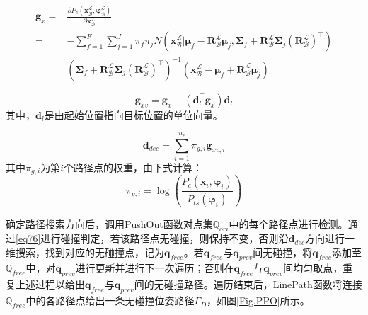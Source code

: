 \documentclass[lang=chs, degree=master, blindreview=false, winfonts=true]{yanputhesis}
\begin{document}
\begin{equation}
	\begin{aligned}
		\label{grad_p}
		\boldsymbol{g}_{x}=&\frac{\partial{P_c({\boldsymbol{x}}_{\mathcal{B}}^{\mathcal{L}},\boldsymbol{\varphi}_{\mathcal{B}}^{\mathcal{L}})}}{\partial{{\boldsymbol{x}}_{\mathcal{B}}^{\mathcal{L}}}}\\
		=&-\sum\limits_{f = 1}^F {\sum\limits_{j = 1}^J {{\pi _f}} } {\pi _j}N(\boldsymbol{x}_{\mathcal{B}}^{\mathcal{L}}|{{\boldsymbol{\mu }}_f} - {\boldsymbol{R}}_{\mathcal{B}}^{\mathcal{L}}{{\boldsymbol{\mu }}_j},{{\boldsymbol{\Sigma }}_f} + {\boldsymbol{R}}_{\mathcal{B}}^{\mathcal{L}}{{\boldsymbol{\Sigma }}_j}{({\boldsymbol{R}}_{\mathcal{B}}^{\mathcal{L}})^{\top}})\\
		&\left({{\boldsymbol{\Sigma }}_f} + {\boldsymbol{R}}_{\mathcal{B}}^{\mathcal{L}}{{\boldsymbol{\Sigma }}_j}{({\boldsymbol{R}}_{\mathcal{B}}^{\mathcal{L}})^{\top}}\right)^{-1}\left({\boldsymbol{x}}_{\mathcal{B}}^{\mathcal{L}}-{{\boldsymbol{\mu }}_f} + {\boldsymbol{R}}_{\mathcal{B}}^{\mathcal{L}}{{\boldsymbol{\mu }}_j}\right)
	\end{aligned}
\end{equation}

\begin{equation}
	\label{verti_grad}
	\boldsymbol{g}_{xv}=\boldsymbol{g}_{x}-(\boldsymbol{d}_{l}^{\top}\boldsymbol{g}_{x})\boldsymbol{d}_{l}
\end{equation}
其中，$\boldsymbol{d}_{l}$是由起始位置指向目标位置的单位向量。

\begin{equation}
	\label{dec_vec}
	\boldsymbol{d}_{dec}=\sum_{i=1}^{n_c} \pi_{g,i}\boldsymbol{g}_{xv,i}
\end{equation}
其中$\pi_{g,i}$为第$i$个路径点的权重，由下式计算：
\begin{equation}
	\pi_{g,i}= \log\left(\frac{P_c({\boldsymbol{x}}_i,\boldsymbol{\varphi}_i)}{P_{ts}(\boldsymbol{\varphi}_i)}\right)
\end{equation}

确定路径搜索方向后，调用PushOut函数对点集$\mathbb{Q}_{ori}$中的每个路径点进行检测。通过\autoref{eq76}进行碰撞判定，若该路径点无碰撞，则保持不变，否则沿$\boldsymbol{d}_{dec}$方向进行一维搜索，找到对应的无碰撞点，记为$\boldsymbol{q}_{free}$。若$\boldsymbol{q}_{free}$与$\boldsymbol{q}_{prev}$间无碰撞，将$\boldsymbol{q}_{free}$添加至$\mathbb{Q}_{free}$中，对$\boldsymbol{q}_{prev}$进行更新并进行下一次遍历；否则在$\boldsymbol{q}_{free}$与$\boldsymbol{q}_{prev}$间均匀取点，重复上述过程以给出$\boldsymbol{q}_{free}$与$\boldsymbol{q}_{prev}$间的无碰撞路径。遍历结束后，LinePath函数将连接$\mathbb{Q}_{free}$中的各路径点给出一条无碰撞位姿路径$\Gamma_{D}$，如图\ref{Fig.PPO}所示。
\end{document}
